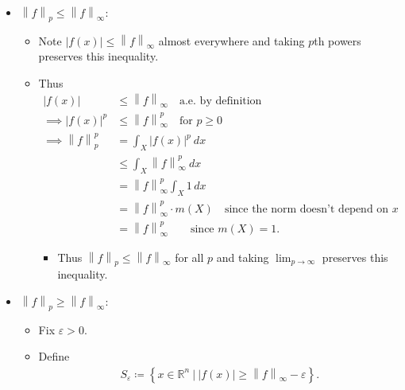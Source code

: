 \begin{solution}

\envlist

\begin{itemize}
\tightlist
\item
  \({\left\lVert {f} \right\rVert}_p \leq {\left\lVert {f} \right\rVert}_\infty\):

  \begin{itemize}
  \item
    Note
    \({\left\lvert {f(x)} \right\rvert} \leq {\left\lVert {f} \right\rVert}_\infty\)
    almost everywhere and taking \(p\)th powers preserves this
    inequality.
  \item
    Thus
    \begin{align*}
    {\left\lvert {f(x)} \right\rvert} &\leq {\left\lVert {f} \right\rVert}_\infty \quad\text{a.e. by definition} \\
    \implies 
    {\left\lvert {f(x)} \right\rvert}^p &\leq {\left\lVert {f} \right\rVert}_\infty^p \quad\text{for } p\geq 0 \\  
    \implies
    {\left\lVert {f} \right\rVert}_p^p 
    &= \int_X {\left\lvert {f(x)} \right\rvert}^p ~dx \\
    &\leq \int_X {\left\lVert {f} \right\rVert}_\infty^p ~dx  \\
    &= {\left\lVert {f} \right\rVert}_\infty^p \int_X 1\,dx \\ 
    &= {\left\lVert {f} \right\rVert}_\infty^p \cdot m(X) \quad\text{since the norm doesn't depend on }x \\
    &= {\left\lVert {f} \right\rVert}_\infty^p \qquad \text{since } m(X) = 1
    .\end{align*}

    \begin{itemize}
    \tightlist
    \item
      Thus
      \({\left\lVert {f} \right\rVert}_p \leq {\left\lVert {f} \right\rVert}_\infty\)
      for all \(p\) and taking \(\lim_{p\to\infty}\) preserves this
      inequality.
    \end{itemize}
  \end{itemize}
\item
  \({\left\lVert {f} \right\rVert}_p \geq {\left\lVert {f} \right\rVert}_\infty\):

  \begin{itemize}
  \item
    Fix \(\varepsilon > 0\).
  \item
    Define
    \begin{align*}
    S_\varepsilon \coloneqq\left\{{x\in {\mathbb{R}}^n {~\mathrel{\Big|}~}{\left\lvert {f(x)} \right\rvert} \geq {\left\lVert {f} \right\rVert}_\infty - \varepsilon}\right\}
    .\end{align*}


\end{itemize}
\end{itemize}
\end{solution}
